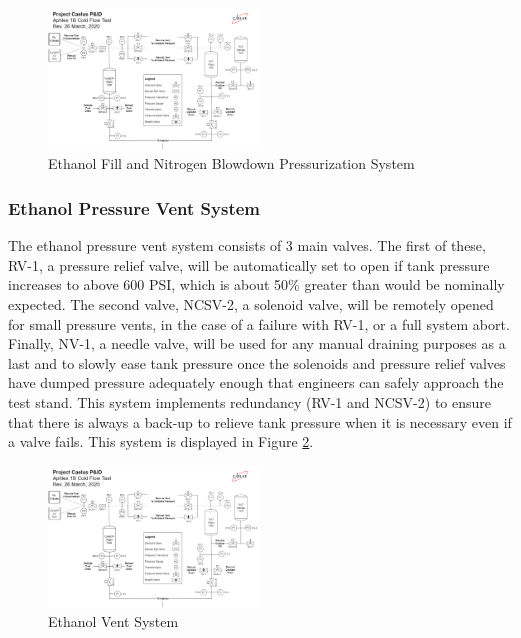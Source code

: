 \documentclass[9pt]{article} %
\numberwithin{equation}{section} %
\begin{document}
\begin{figure}[!htb] 
    \centering
    \includegraphics[scale=0.5, width=0.5\textwidth, trim={0cm 19cm 34.05cm 5cm}, clip]{pid} %
    \caption{Ethanol Fill and Nitrogen Blowdown Pressurization System}
    \label{fig:ethanol_fill_and_pressurization_system}
\end{figure}

\subsubsection{Ethanol Pressure Vent System}
\hspace{\parindent} The ethanol pressure vent system consists of 3 main valves. The first of these, RV-1, a pressure relief valve, will be automatically set to open if tank pressure increases to above 600 PSI, which is about 50\% greater than would be nominally expected. The second valve, NCSV-2, a solenoid valve, will be remotely opened for small pressure vents, in the case of a failure with RV-1, or a full system abort. Finally, NV-1, a needle valve, will be used for any manual draining purposes as a last and to slowly ease tank pressure once the solenoids and pressure relief valves have dumped pressure adequately enough that engineers can safely approach the test stand. This system implements redundancy (RV-1 and NCSV-2) to ensure that there is always a back-up to relieve tank pressure when it is necessary even if a valve fails. This system is displayed in Figure \ref{fig:ethanol_vent_system}.

\begin{figure}[!htb] 
    \centering
    \includegraphics[scale=0.5, width=0.5\textwidth, trim={15cm 18cm 18.3cm 5cm}, clip]{pid} %
    \caption{Ethanol Vent System}
    \label{fig:ethanol_vent_system}
\end{figure}
\end{document}
